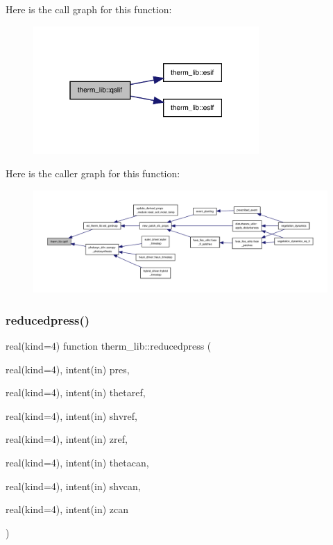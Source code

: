 Here is the call graph for this function\+:
\nopagebreak
\begin{figure}[H]
\begin{center}
\leavevmode
\includegraphics[width=244pt]{namespacetherm__lib_a44ab3a68e6060bf4afbfc504e3a8c633_cgraph}
\end{center}
\end{figure}
Here is the caller graph for this function\+:
\nopagebreak
\begin{figure}[H]
\begin{center}
\leavevmode
\includegraphics[width=350pt]{namespacetherm__lib_a44ab3a68e6060bf4afbfc504e3a8c633_icgraph}
\end{center}
\end{figure}
\mbox{\label{namespacetherm__lib_ad37c9d26367d1a2678cd1875d21f05fd}} 
\subsubsection{\texorpdfstring{reducedpress()}{reducedpress()}}
{\footnotesize\ttfamily real(kind=4) function therm\+\_\+lib\+::reducedpress (\begin{DoxyParamCaption}\item[{real(kind=4), intent(in)}]{pres,  }\item[{real(kind=4), intent(in)}]{thetaref,  }\item[{real(kind=4), intent(in)}]{shvref,  }\item[{real(kind=4), intent(in)}]{zref,  }\item[{real(kind=4), intent(in)}]{thetacan,  }\item[{real(kind=4), intent(in)}]{shvcan,  }\item[{real(kind=4), intent(in)}]{zcan }\end{DoxyParamCaption})}

